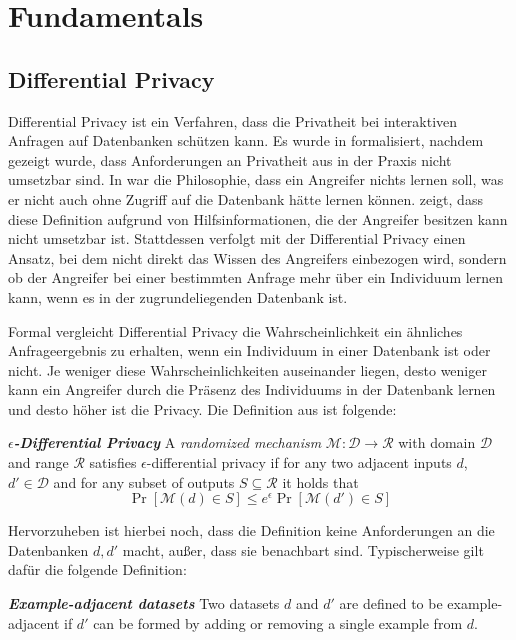\chapter{Fundamentals}

\section{Differential Privacy}

Differential Privacy ist ein Verfahren, dass die Privatheit bei interaktiven Anfragen auf Datenbanken schützen kann. Es wurde in \cite{dwork:2006} formalisiert, nachdem gezeigt wurde, dass Anforderungen an Privatheit aus \cite{dalenius:1977} in der Praxis nicht umsetzbar sind. In \cite{dalenius:1977} war die Philosophie, dass ein Angreifer nichts lernen soll, was er nicht auch ohne Zugriff auf die Datenbank hätte lernen können. \textcite{dwork:2006} zeigt, dass diese Definition aufgrund von Hilfsinformationen, die der Angreifer besitzen kann nicht umsetzbar ist. Stattdessen verfolgt \textcite{dwork:2006} mit der Differential Privacy einen Ansatz, bei dem nicht direkt das Wissen des Angreifers einbezogen wird, sondern ob der Angreifer bei einer bestimmten Anfrage mehr über ein Individuum lernen kann, wenn es in der zugrundeliegenden Datenbank ist.

Formal vergleicht Differential Privacy die Wahrscheinlichkeit ein ähnliches Anfrageergebnis zu erhalten, wenn ein Individuum in einer Datenbank ist oder nicht. Je weniger diese Wahrscheinlichkeiten auseinander liegen, desto weniger kann ein Angreifer durch die Präsenz des Individuums in der Datenbank lernen und desto höher ist die Privacy. Die Definition aus \cite{dwork:2006} ist folgende:

\begin{definition}\label{def:eps-differential-privacy}
	\emph{\textbf{$\epsilon$-Differential Privacy}} A \textit{randomized mechanism} $\mathcal{M}: \mathcal{D} \rightarrow \mathcal{R}$ with domain $\mathcal{D}$ and range $\mathcal{R}$ satisfies $\epsilon$-differential privacy if for any two adjacent inputs $d$, $d' \in \mathcal{D}$ and for any subset of outputs $S \subseteq \mathcal{R}$ it holds that $$\Pr[\mathcal{M}(d) \in S] \leq e^{\epsilon} \Pr[\mathcal{M}(d') \in S]$$
\end{definition}

Hervorzuheben ist hierbei noch, dass die Definition keine Anforderungen an die Datenbanken $d, d'$ macht, außer, dass sie benachbart sind. Typischerweise gilt dafür die folgende Definition:
\begin{definition}\label{def:example-adjacency}
	\emph{\textbf{Example-adjacent datasets}} Two datasets $d$ and $d'$ are defined to be example-adjacent if $d'$ can be formed by adding or removing a single example from $d$.
\end{definition}

